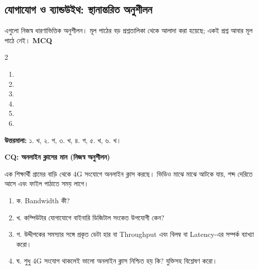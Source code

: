 \begingroup
\chTwoReadableTopicStyle
\subsection{যোগাযোগ ও ব্যান্ডউইথ: স্থানান্তরিত অনুশীলন}
এগুলো নিজস্ব ধারণাভিত্তিক অনুশীলন। মূল পাঠের বড় প্রশ্নতালিকা থেকে আলাদা করা হয়েছে; একই প্রশ্ন আবার মূল পাঠে নেই।
\textbf{MCQ}
\begin{multicols}{2}\begin{enumerate}
\item{}
\item{}
\item{}
\item{}
\item{}
\item{}
\end{enumerate}\end{multicols}
\textbf{উত্তরমালা:} ১. খ, ২. গ, ৩. খ, ৪. গ, ৫. খ, ৬. খ।

\textbf{CQ: অনলাইন ক্লাসের মান (নিজস্ব অনুশীলন)}\par
এক শিক্ষার্থী গ্রামের বাড়ি থেকে 4G সংযোগে অনলাইন ক্লাস করছে। ভিডিও মাঝে মাঝে আটকে যায়, শব্দ দেরিতে আসে এবং ফাইল পাঠাতে সময় লাগে।
\begin{enumerate}
\item ক. Bandwidth কী?
\item খ. কম্পিউটার যোগাযোগে বাইনারি ডিজিটাল সংকেত উপযোগী কেন?
\item গ. উদ্দীপকের সমস্যার সঙ্গে প্রকৃত ডেটা হার বা Throughput এবং বিলম্ব বা Latency-এর সম্পর্ক ব্যাখ্যা করো।
\item ঘ. শুধু 4G সংযোগ থাকলেই ভালো অনলাইন ক্লাস নিশ্চিত হয় কি? যুক্তিসহ বিশ্লেষণ করো।
\end{enumerate}
\endgroup
